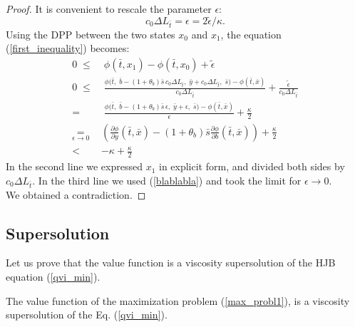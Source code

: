 \begin{proof}
\noindent It is convenient to rescale the parameter $\epsilon$: 
\begin{equation}\label{blablabla}
c_0 \Delta L_{\bar t} = \epsilon = 2 \tilde \epsilon / \kappa.       
\end{equation}
Using the DPP between the two states $x_0$ and $x_1$, the equation (\ref{first_inequality}) becomes: 
\begin{align*}
 0 \; \leq & \; \phi(\bar t, x_1) - \phi(\bar t, x_0) + \tilde \epsilon \\
 0 \; \leq & \; \frac{\phi \bigl( \bar t,\; \bar b - (1+\theta_b) \bar s\, c_0 \Delta L_{\bar t},\; \bar y + c_0 \Delta L_{\bar t}, \; \bar s \bigr) - 
         \phi(\bar t, \bar x)}{c_0 \Delta L_{\bar t}}  
            + \frac{\tilde \epsilon}{c_0 \Delta L_{\bar t}} \\
         = & \; \frac{\phi \bigl( \bar t,\; \bar b - (1+\theta_b) \bar s\, \epsilon, \; \bar y + \epsilon,\; \bar s \bigr) - 
         \phi(\bar t, \bar x)}{\epsilon}  
            + \frac{\kappa}{2} \\   
         \underset{\epsilon \to 0}{=} & \left(\frac{\partial \phi}{\partial y}(\bar t, \bar x) -(1+\theta_b) \bar s \frac{\partial \phi}{\partial b}(\bar t, \bar x)\right) 
                                   + \frac{\kappa}{2}  \\
	                    < & -\kappa + \frac{\kappa}{2}
\end{align*}
In the second line we expressed $x_1$ in explicit form, and divided both sides by $c_0 \Delta L_{\bar t}$. In the third line we used (\ref{blablabla}) 
and took the limit for $\epsilon \to 0$.\\
We obtained a contradiction.
\end{proof}





\subsection{Supersolution}

Let us prove that the value function is a viscosity supersolution of the HJB equation (\ref{qvi_min}). 

\begin{Theorem}\label{supersolution_th}
 The value function of the maximization problem (\ref{max_probl1}), is a viscosity supersolution of the Eq. (\ref{qvi_min}).
\end{Theorem}

